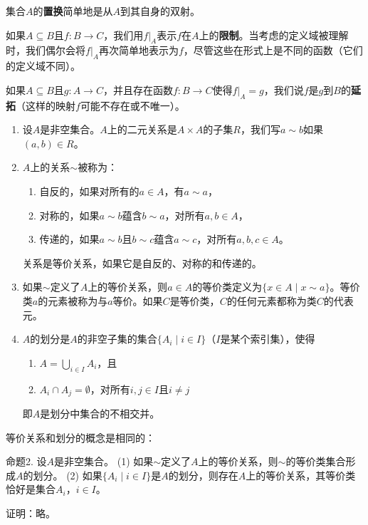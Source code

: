 集合$A$的\textbf{置换}简单地是从$A$到其自身的双射。

如果$A \subseteq B$且$f: B \to C$，我们用$f|_A$表示$f$在$A$上的\textbf{限制}。当考虑的定义域被理解时，我们偶尔会将$f|_A$再次简单地表示为$f$，尽管这些在形式上是不同的函数（它们的定义域不同）。

如果$A \subseteq B$且$g: A \to C$，并且存在函数$f: B \to C$使得$f|_A = g$，我们说$f$是$g$到$B$的\textbf{延拓}（这样的映射$f$可能不存在或不唯一）。
\begin{enumerate}[label=(\arabic*)]
\item 设$A$是非空集合。$A$上的二元关系是$A \times A$的子集$R$，我们写$a \sim b$如果$(a, b) \in R$。
    
\item $A$上的关系$\sim$被称为：
\begin{enumerate}[label=(\alph*)]
\item 自反的，如果对所有的$a \in A$，有$a \sim a$，
\item 对称的，如果$a \sim b$蕴含$b \sim a$，对所有$a, b \in A$，
\item 传递的，如果$a \sim b$且$b \sim c$蕴含$a \sim c$，对所有$a, b, c \in A$。
        \end{enumerate}
        关系是等价关系，如果它是自反的、对称的和传递的。
    
    \item 如果$\sim$定义了$A$上的等价关系，则$a \in A$的等价类定义为$\{ x \in A \mid x \sim a \}$。等价类$a$的元素被称为与$a$等价。如果$C$是等价类，$C$的任何元素都称为类$C$的代表元。
    
    \item $A$的划分是$A$的非空子集的集合$\{ A_i \mid i \in I \}$（$I$是某个索引集），使得
        \begin{enumerate}[label=(\alph*)]
            \item $A = \bigcup_{i \in I} A_i$，且
            \item $A_i \cap A_j = \emptyset$，对所有$i, j \in I$且$i \neq j$
        \end{enumerate}
        即$A$是划分中集合的不相交并。
\end{enumerate}


等价关系和划分的概念是相同的：

命题2. 设$A$是非空集合。
(1) 如果$\sim$定义了$A$上的等价关系，则$\sim$的等价类集合形成$A$的划分。
(2) 如果$\{ A_i \mid i \in I \}$是$A$的划分，则存在$A$上的等价关系，其等价类恰好是集合$A_i$，$i \in I$。

证明：略。

